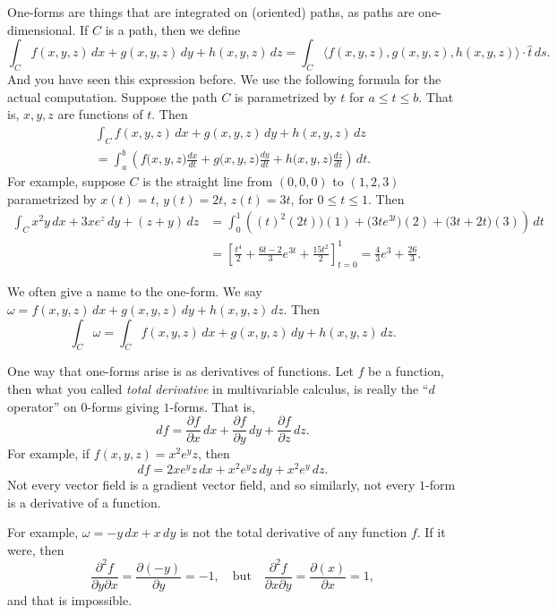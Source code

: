 \documentclass[12pt]{article}
\begin{document}
One-forms are things that are integrated on (oriented) paths, as paths are
one-dimensional.  If $C$ is a path, then we define 
\begin{equation*}
\int_C
f(x,y,z) \, dx + 
g(x,y,z) \, dy + 
h(x,y,z) \, dz 
=
\int_C
\langle f(x,y,z) , g(x,y,z) , h(x,y,z) \rangle \cdot \hat{t} \, ds .
\end{equation*}
And you have seen this expression before.
We use the following formula for the actual computation.
Suppose the path $C$ is parametrized by $t$
for $a \leq t \leq b$.  That is, $x,y,z$ are functions of $t$.  Then
\begin{multline} \label{eq:oneformev}
\int_C
f(x,y,z) \, dx + 
g(x,y,z) \, dy + 
h(x,y,z) \, dz 
\\
=
\int_a^b 
\left( f\bigl(x,y,z\bigr) \frac{d x}{d t}
+
g\bigl(x,y,z\bigr) \frac{d y}{d t}
+ 
h\bigl(x,y,z\bigr) \frac{d z}{d t}
\right) \, dt.
\end{multline}
For example, suppose $C$ is the straight line from $(0,0,0)$ to $(1,2,3)$
parametrized by $x(t) = t$, $y(t) = 2t$, $z(t) = 3t$, for $0 \leq t \leq 1$.
Then
\begin{equation*}
\begin{split}
\int_C
x^2y \, dx + 
3xe^z \, dy + 
(z+y) \, dz 
& =
\int_0^1 
\left( (t)^2 (2t) \bigr) (1)
+
\bigl(3te^{3t} \bigr) (2)
+ 
\bigl(3t+2t\bigr) (3)
\right) \, dt
\\
& = \left[
\frac{t^4}{2}
+
\frac{6t-2}{3} e^{3t}
+
\frac{15t^2}{2}
\right]_{t=0}^1
=
\frac{4}{3} e^3 + \frac{26}{3} .
\end{split}
\end{equation*}

We often give a name to the one-form.  We say
$\omega = f(x,y,z) \, dx + g(x,y,z) \, dy + h(x,y,z) \, dz$.
Then
\[
\int_C \omega = 
\int_C
f(x,y,z) \, dx + 
g(x,y,z) \, dy + 
h(x,y,z) \, dz .
\]

One way that one-forms arise is as derivatives of functions.
Let $f$ be a function, then what you called
\emph{total derivative}
in multivariable calculus,
is really the ``$d$ operator'' on $0$-forms giving $1$-forms.  That
is,
\[
df =
\frac{\partial f}{\partial x}\, dx + 
\frac{\partial f}{\partial y}\, dy + 
\frac{\partial f}{\partial z}\, dz .
\]
For example, if $f(x,y,z) = x^2e^yz$, then
\[
df = 
2xe^y z\, dx + 
x^2e^yz\, dy + 
x^2e^y\, dz .
\]
Not every vector field is a gradient vector field, and so
similarly, not every $1$-form is a derivative of a function.

For example, $\omega = -y\, dx + x \, dy$ is not the total derivative
of any function $f$.  If it were, then
\begin{equation*}
\frac{\partial^2 f}{\partial y \partial x} = 
\frac{\partial (-y)}{\partial y} = -1,
\quad \text{but} \quad 
\frac{\partial^2 f}{\partial x \partial y} = 
\frac{\partial (x)}{\partial x} = 1,
\end{equation*}
and that is impossible.
\end{document}
